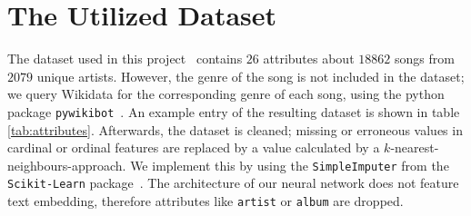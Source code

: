 \documentclass[
  12pt,
  bibliography=totoc,     %
  captions=tableheading,  %
  titlepage=firstiscover, %
]{scrartcl}
\begin{document}
\section{The Utilized Dataset}
The dataset used in this project~\cite{Datensatz} contains $26$ attributes about $18862$ songs from $2079$ unique artists.
However, the genre of the song is not included in the dataset; we query Wikidata for the corresponding genre of each song,
using the python package \texttt{pywikibot}~\cite{pywikibot}. An example entry of the resulting dataset is shown in table \ref{tab:attributes}.
Afterwards, the dataset is cleaned; missing or erroneous values
in cardinal or ordinal features are replaced by a value calculated by a $k$-nearest-neighbours-approach. We implement this
by using the \texttt{SimpleImputer} from the \texttt{Scikit-Learn} package~\cite{scikit-learn}. The architecture of our
neural network does not feature text embedding, therefore attributes like \texttt{artist} or \texttt{album} are dropped.
\end{document}
